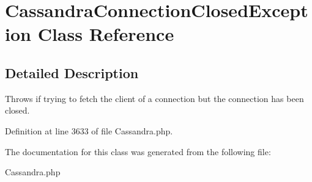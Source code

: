 \hypertarget{classCassandraConnectionClosedException}{
\section{CassandraConnectionClosedException Class Reference}
\label{classCassandraConnectionClosedException}
}


\subsection{Detailed Description}
Throws if trying to fetch the client of a connection but the connection has been closed. 

Definition at line 3633 of file Cassandra.php.



The documentation for this class was generated from the following file:\begin{DoxyCompactItemize}
\item 
Cassandra.php\end{DoxyCompactItemize}
